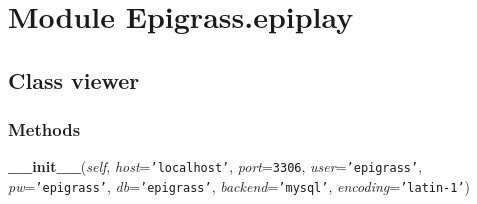 %
%
%


\section{Module Epigrass.epiplay}

    \label{Epigrass:epiplay}


\subsection{Class viewer}

    \label{Epigrass:epiplay:viewer}


  \subsubsection{Methods}

    \label{Epigrass:epiplay:viewer:__init__}

    \vspace{0.5ex}

    \begin{boxedminipage}{\textwidth}

    \raggedright \textbf{\_\_init\_\_}(\textit{self}, \textit{host}=\texttt{'localhost'}, \textit{port}=\texttt{3306}, \textit{user}=\texttt{'epigrass'}, \textit{pw}=\texttt{'epigrass'}, \textit{db}=\texttt{'epigrass'}, \textit{backend}=\texttt{'mysql'}, \textit{encoding}=\texttt{'latin-1'})

    \end{boxedminipage}

